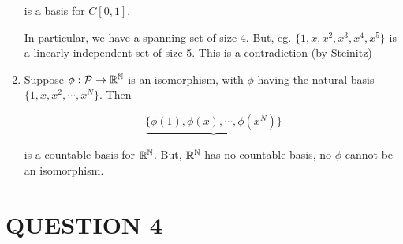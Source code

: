 \documentclass[a4paper]{article}
\begin{document}
\begin{enumerate}[label = (\alph*)]
		is a basis for $ C[0,1] $.
		
		In particular, we have a spanning set of size 4. But, eg. $ \{1,x,x^{2},x^{3},x^{4},x^{5}\} $ is a linearly independent set of size 5. This is a contradiction (by Steinitz)
		
		\item Suppose $ \phi : \mathcal{P} \to \mathbb{R}^{\mathbb{N}} $ is an isomorphism, with $ \phi $ having the natural basis $ \{  1,x,x^{2},\cdots,x^{N}\} $. Then

		\[ \underbrace{\{ \phi(1),\phi(x),\cdots,\phi(x^{N}) \}} \]
		
		is a countable basis for $ \mathbb{R}^{\mathbb{N}} $. But, $ \mathbb{R}^{\mathbb{N}} $ has no countable basis, no $ \phi $ cannot be an isomorphism. 
		
		
	\end{enumerate}
		
	\section{QUESTION 4}
	
\end{document}
